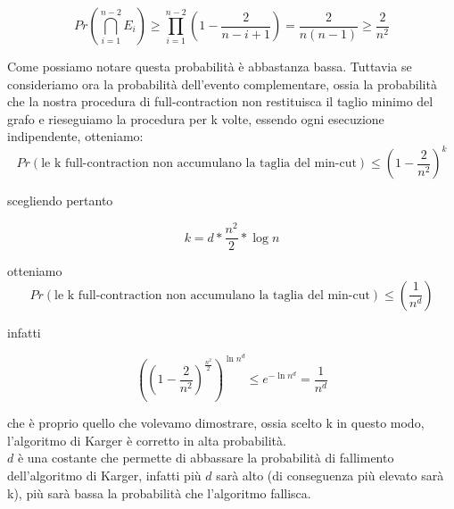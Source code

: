 $$Pr(\bigcap_{i=1}^{n-2} E_{i}) \geq \prod_{i=1}^{n-2} (1 - \dfrac{2}{n-i+1}) = \dfrac{2}{n(n-1)} \geq \dfrac{2}{n^2}$$

\noindent Come possiamo notare questa probabilità è abbastanza bassa. Tuttavia se consideriamo ora la probabilità dell'evento complementare, ossia la probabilità che la nostra procedura di full-contraction non restituisca il taglio minimo del grafo e rieseguiamo la procedura per k volte, essendo ogni esecuzione indipendente, otteniamo:
$$ Pr(\text{le k full-contraction non accumulano la taglia del min-cut}) \leq \left( 1- \dfrac{2}{n^2} \right) ^k $$

\noindent scegliendo pertanto

$$ k = d * \dfrac{n^2}{2} * \log{n} $$

\noindent otteniamo
$$ Pr(\text{le k full-contraction non accumulano la taglia del min-cut}) \leq \left( \dfrac{1}{n^d} \right) $$

\noindent infatti

$$\left( \left( 1-\frac{2}{n^2} \right) ^{\frac{n^2}{2}} \right) ^{\ln {n^d}} \leq e^{-\ln n^d} = \dfrac{1}{n^d}$$

\noindent che è proprio quello che volevamo dimostrare, ossia scelto k in questo modo, l'algoritmo di Karger è corretto in alta probabilità.\\

\noindent $d$ è una costante che permette di abbassare la probabilità di fallimento dell'algoritmo di Karger, infatti più $d$ sarà alto (di conseguenza più elevato sarà k), più sarà bassa la probabilità che l'algoritmo fallisca.


